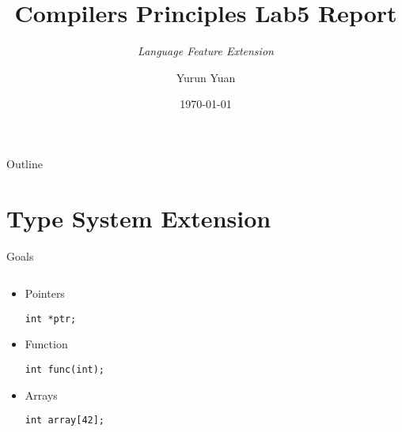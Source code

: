 \documentclass{beamer}
\title{Compilers Principles Lab5 Report }
\subtitle{\it{Language Feature Extension}}
\author{Yurun Yuan}
\institute{CS, USTC}
\date{\today}
\begin{document}

\begin{frame}
    \titlepage
\end{frame}

\begin{frame}{Outline}
    \tableofcontents
\end{frame}



\section{Type System Extension}

\begin{frame}{Goals}
    \begin{columns}
        \begin{column}[]{0.5\textwidth}
            \begin{itemize}
                \item Pointers

                      \lstinline{int *ptr;}

                \item Function

                      \lstinline{int func(int);}

                \item Arrays

                      \lstinline{int array[42];}
            \end{itemize}
        \end{column}
        \begin{column}[]{0.5\textwidth}
        \end{column}
    \end{columns}
\end{frame}
\end{document}
